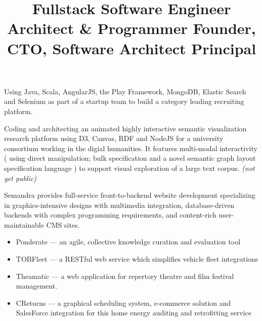 \documentclass[line,margin]{res}
\begin{document}
\begin{resume}
\title{ Fullstack Software Engineer }
\begin{position}
Using Java, Scala, AngularJS, the Play Framework, MongoDB, Elastic Search and Selenium 
as part of a startup team to build a category leading recruiting platform.
\end{position}

\title{ Architect \& Programmer }
\begin{position}
Coding and architecting an animated highly interactive semantic visualization research platform using 
D3, Canvas, RDF and NodeJS for a university consortium working in the digial humanities.  
It features multi-modal interactivity ( using direct manipulation; bulk specification 
and a novel semantic graph layout specification language ) to support visual exploration of a 
large text corpus. \emph{(not yet public)}
\end{position}

\title{ Founder, CTO, Software Architect }
\begin{position}
Semandra provides full-service front-to-backend
website development specializing in graphics-intensive designs with
multimedia integration, database-driven backends with complex
programming requirements, and content-rich user-maintainable CMS
sites.

\begin{itemize}
  \item Ponderate --- an agile, collective knowledge curation and evaluation tool
  \item TOBFleet --- a RESTful web service which simplifies vehicle fleet integrations
  \item Theamatic --- a web application for repertory theatre and film 
    festival management.
  \item CReturns --- a graphical scheduling system, e-commerce
    solution and SalesForce integration for this home energy auditing and
    retrofitting service
\end{itemize}

\end{position}


\title{ Principal }


\end{resume}
\end{document}
